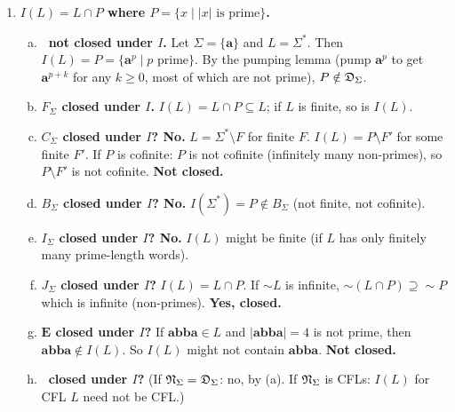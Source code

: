 \begin{enumerate}[{5.}1. ]
\begin{enumerate}[(a)]
  \item \textbf{Proof.}  The counter tracks position modulo 3; every multiple-of-3 position is skipped.

  \item $L(A')\in\DSIG$. \qed
\end{enumerate}

\item \textbf{$I(L)=L\cap P$ where $P=\{x\mid|x|\text{ is prime}\}$.}

\begin{enumerate}[(a)]
  \item \textbf{\DSIG\ not closed under $I$.}  Let $\Sigma=\{\pmb{a}\}$ and $L=\Sigma^*$.  Then $I(L)=P=\{\pmb{a}^p\mid p\text{ prime}\}$.  By the pumping lemma (pump $\pmb{a}^p$ to get $\pmb{a}^{p+k}$ for any $k\ge 0$, most of which are not prime), $P\notin\mathfrak{D}_\Sigma$.

  \item \textbf{$F_\Sigma$ closed under $I$.}  $I(L)=L\cap P\subseteq L$; if $L$ is finite, so is $I(L)$.

  \item \textbf{$C_\Sigma$ closed under $I$? No.}  $L=\Sigma^*\setminus F$ for finite $F$.  $I(L)=P\setminus F'$ for some finite $F'$.  If $P$ is cofinite: $P$ is not cofinite (infinitely many non-primes), so $P\setminus F'$ is not cofinite.  \textbf{Not closed.}

  \item \textbf{$B_\Sigma$ closed under $I$? No.}  $I(\Sigma^*)=P\notin B_\Sigma$ (not finite, not cofinite).

  \item \textbf{$I_\Sigma$ closed under $I$? No.}  $I(L)$ might be finite (if $L$ has only finitely many prime-length words).

  \item \textbf{$J_\Sigma$ closed under $I$?}  $I(L)=L\cap P$.  If $\sim L$ is infinite, $\sim(L\cap P)\supseteq\sim P$ which is infinite (non-primes).  \textbf{Yes, closed.}

  \item \textbf{$\pmb{E}$ closed under $I$?}  If $\pmb{abba}\in L$ and $|\pmb{abba}|=4$ is not prime, then $\pmb{abba}\notin I(L)$.  So $I(L)$ might not contain $\pmb{abba}$.  \textbf{Not closed.}

  \item \textbf{\NSIG\ closed under $I$?}  (If $\mathfrak{N}_\Sigma=\mathfrak{D}_\Sigma$: no, by (a).  If $\mathfrak{N}_\Sigma$ is CFLs: $I(L)$ for CFL $L$ need not be CFL.)
\end{enumerate}


\end{enumerate}
